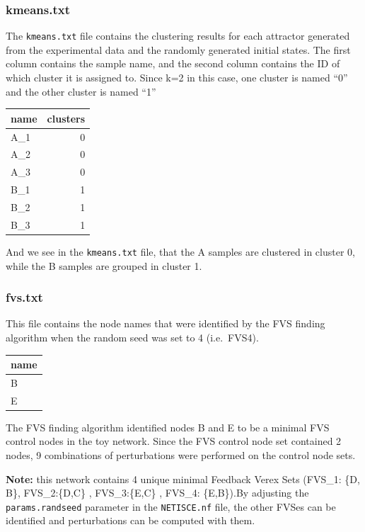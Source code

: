 \documentclass[
]{book}
\begin{document}
\hypertarget{section-id}{%
\subsubsection*{kmeans.txt}\label{section-id}}

The \texttt{kmeans.txt} file contains the clustering results for each attractor generated from the experimental data and the randomly generated initial states. The first column contains the sample name, and the second column contains the ID of which cluster it is assigned to. Since k=2 in this case, one cluster is named
``0'' and the other cluster is named ``1''

\begin{tabular}{l|r}
\hline
name & clusters\\
\hline
A\_1 & 0\\
\hline
A\_2 & 0\\
\hline
A\_3 & 0\\
\hline
B\_1 & 1\\
\hline
B\_2 & 1\\
\hline
B\_3 & 1\\
\hline
\end{tabular}

And we see in the \texttt{kmeans.txt} file, that the A samples are clustered in cluster 0, while the B samples are grouped in cluster 1.

\hypertarget{section-id}{%
\subsubsection*{fvs.txt}\label{section-id}}

This file contains the node names that were identified by the FVS finding algorithm when the random seed was set to 4 (i.e.~FVS4).

\begin{tabular}{l}
\hline
name\\
\hline
B\\
\hline
E\\
\hline
\end{tabular}

The FVS finding algorithm identified nodes B and E to be a minimal FVS control nodes in the toy network. Since the FVS control node set contained 2 nodes, 9 combinations of perturbations were performed on the control node sets.

\textbf{Note: } this network contains 4 unique minimal Feedback Verex Sets (FVS\_1: \{D, B\}, FVS\_2:\{D,C\} , FVS\_3:\{E,C\} , FVS\_4: \{E,B\}).By adjusting the \texttt{params.randseed} parameter in the \texttt{NETISCE.nf} file, the other FVSes can be identified and perturbations can be computed with them.
\end{document}
